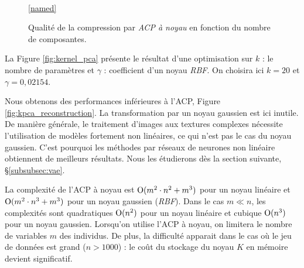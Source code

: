 \begin{figure}[hbtp]
	\centering
	\begin{adjustbox}{width=0.80\textwidth}
	\end{adjustbox}
	\\
	\ref{named}
	\caption{Qualité de la compression par \textit{ACP à noyau} en fonction du nombre de composantes.}
	\label{fig:kpca_plot}
\end{figure}

La Figure \ref{fig:kernel_pca} présente le résultat d'une optimisation sur $k$ : le nombre de paramètres et $\gamma$ : coefficient d'un noyau \textit{RBF}. On choisira ici $k = 20$ et $\gamma = 0,02154$.

Nous obtenons des performances inférieures à l'ACP, Figure \ref{fig:kpca_reconstruction}.
La transformation par un noyau gaussien est ici inutile.
De manière générale, le traitement d'images aux textures complexes nécessite l'utilisation de modèles fortement non linéaires, ce qui n'est pas le cas du noyau gaussien.
C'est pourquoi les méthodes par réseaux de neurones non linéaire obtiennent de meilleurs résultats.
Nous les étudierons dès la section suivante, §\ref{subsubsec:vae}.

La complexité de l'ACP à noyau est $\operatorname{O}(m^{2} \cdot n^2+m^{3})$ pour un noyau linéaire et $\operatorname{O}(m^{2} \cdot n^3+m^{3})$ pour un noyau gaussien (\textit{RBF}).
Dans le cas $m \ll n$, les complexités sont quadratiques $\operatorname{O}(n^2)$ pour un noyau linéaire et cubique $\operatorname{O}(n^3)$ pour un noyau gaussien.
Lorsqu'on utilise l'ACP à noyau, on limitera le nombre de variables $m$ des individus.
De plus, la difficulté apparait dans le cas où le jeu de données est grand ($n > 1000$) : le coût du stockage du noyau $K$ en mémoire devient significatif.

